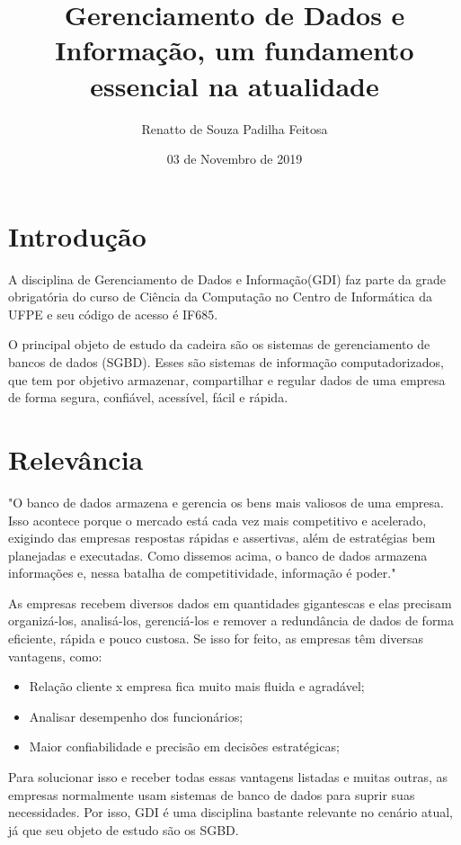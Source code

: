 \documentclass[10pt]{article}
\title{Gerenciamento de Dados e Informação, um fundamento essencial na atualidade}
\author{Renatto de Souza Padilha Feitosa}
\date{03 de Novembro de 2019}
\begin{document}
\maketitle

\section{Introdução}
A disciplina de Gerenciamento de Dados e Informação(GDI) faz parte da grade obrigatória do curso de Ciência da Computação no Centro de Informática da UFPE e seu código de acesso é IF685. \cite{CinWiki}

O principal objeto de estudo da cadeira são os sistemas de gerenciamento de bancos de dados (SGBD).\cite{CinGDI} Esses são sistemas de informação computadorizados, que tem por objetivo armazenar, compartilhar e regular dados de uma empresa de forma segura, confiável, acessível, fácil e rápida. \cite{RicardoBancodeDados}

\section{Relevância}
"O banco de dados armazena e gerencia os bens mais valiosos de uma empresa. Isso acontece porque o mercado está cada vez mais competitivo e acelerado, exigindo das empresas respostas rápidas e assertivas, além de estratégias bem planejadas e executadas. Como dissemos acima, o banco de dados armazena informações e, nessa batalha de competitividade, informação é poder." \cite{ImpactaBancodeDados}

As empresas recebem diversos dados em quantidades gigantescas e elas precisam organizá-los, analisá-los, gerenciá-los e remover a redundância de dados de forma eficiente, rápida e pouco custosa.\cite{IntersoulBancodeDados} Se isso for feito, as empresas têm diversas vantagens, como:

\begin{itemize}
\item Relação cliente x empresa fica muito mais fluida e agradável;
\item Analisar desempenho dos funcionários;
\item Maior confiabilidade e precisão em decisões estratégicas;
\end{itemize}

Para solucionar isso e receber todas essas vantagens listadas e muitas outras, as empresas normalmente usam sistemas de banco de dados para suprir suas necessidades.\cite{ImportanciaMarcel} Por isso, GDI é uma disciplina bastante relevante no cenário atual, já que seu objeto de estudo são os SGBD. \cite{CinGDI}
\end{document}
